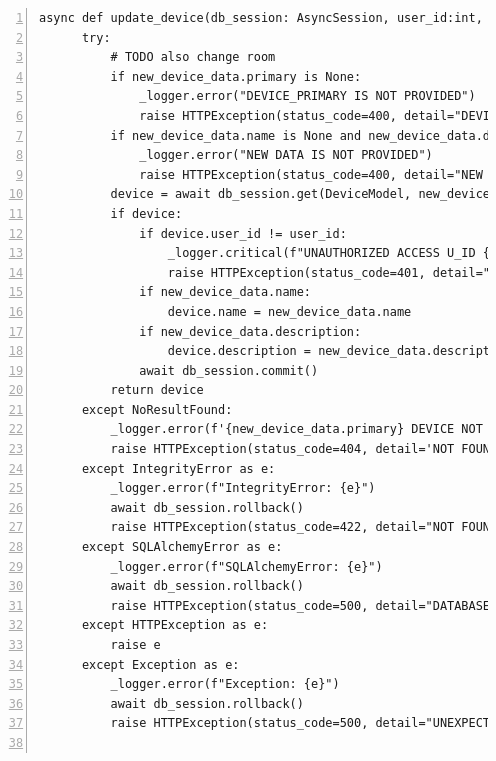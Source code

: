 \documentclass[12pt, letterpaper]{article}
\begin{document}
\begin{lstlisting}[frame=single, style=py, numbers=left, label={lst:dbqueries}, caption={db: queries.py}]
  async def update_device(db_session: AsyncSession, user_id:int, new_device_data):
      try:
          # TODO also change room
          if new_device_data.primary is None:
              _logger.error("DEVICE_PRIMARY IS NOT PROVIDED")
              raise HTTPException(status_code=400, detail="DEVICE_PRIMARY IS NOT PROVIDED")
          if new_device_data.name is None and new_device_data.description is None:
              _logger.error("NEW DATA IS NOT PROVIDED")
              raise HTTPException(status_code=400, detail="NEW DATA IS NOT PROVIDED")
          device = await db_session.get(DeviceModel, new_device_data.primary)
          if device:
              if device.user_id != user_id:
                  _logger.critical(f"UNAUTHORIZED ACCESS U_ID {user_id} ON DEVICE {device.primary_key}")
                  raise HTTPException(status_code=401, detail="User is not owner of this device")
              if new_device_data.name:
                  device.name = new_device_data.name
              if new_device_data.description:
                  device.description = new_device_data.description
              await db_session.commit()
          return device
      except NoResultFound:
          _logger.error(f'{new_device_data.primary} DEVICE NOT FOUND')
          raise HTTPException(status_code=404, detail='NOT FOUND')
      except IntegrityError as e:
          _logger.error(f"IntegrityError: {e}")
          await db_session.rollback()
          raise HTTPException(status_code=422, detail="NOT FOUND")
      except SQLAlchemyError as e:
          _logger.error(f"SQLAlchemyError: {e}")
          await db_session.rollback()
          raise HTTPException(status_code=500, detail="DATABASE ERROR")
      except HTTPException as e:
          raise e
      except Exception as e:
          _logger.error(f"Exception: {e}")
          await db_session.rollback()
          raise HTTPException(status_code=500, detail="UNEXPECTED DATABASE ERROR")
      

\end{lstlisting}
\end{document}
